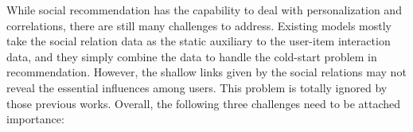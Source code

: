 \documentclass[letterpaper]{article} %
\begin{document}

While social recommendation has the capability to deal with personalization and correlations, there are still many challenges to address. Existing models mostly take the social relation data as the static auxiliary to the user-item interaction data, and they simply combine the data to handle the cold-start problem in recommendation. However, the shallow links given by the social relations may not reveal the essential influences among users. This problem is totally ignored by those previous works.
Overall, the following three challenges need to be attached importance:
\end{document}
